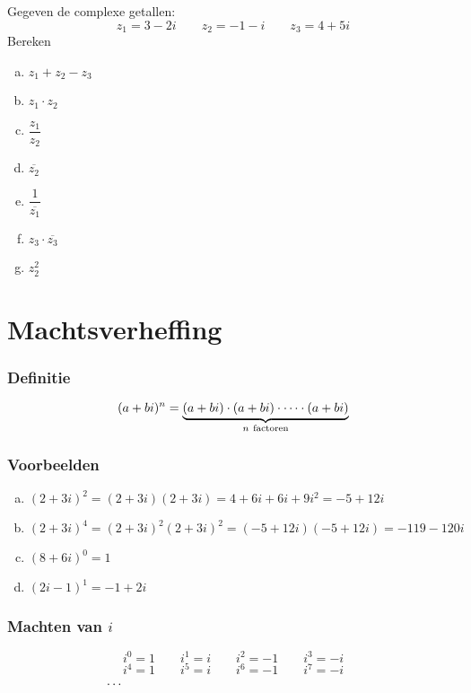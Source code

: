 \documentclass[12pt,twoside,a4]{article}
\begin{document}
\begin{oefening}
  Gegeven de complexe getallen:
  $$z_1=3-2i \qquad z_2=-1-i \qquad z_3=4+5i$$
  Bereken
  \begin{multicols}{2}
    \begin{enumerate}[(a)]
      \itemsep 1em
    \item $\displaystyle z_1+z_2-z_3$
    \item $\displaystyle z_1\cdot z_2$
    \item $\displaystyle \dfrac{z_1}{z_2}$
    \item $\displaystyle \overline{z_2}$
    \item $\displaystyle \dfrac{1}{\overline{z_1}}$
    \item $\displaystyle z_3\cdot \overline{z_3}$
    \item $\displaystyle z_2^2$
    \end{enumerate}
  \end{multicols}
\end{oefening}

\pagebreak

\section{Machtsverheffing}

\subsubsection*{Definitie}
\begin{mdframed}
$$(a+bi)^n = \underbrace{(a+bi)\cdot(a+bi)\cdot\cdots\cdot(a+bi)}_{n\mbox{ \scriptsize factoren}}$$
\end{mdframed}

\subsubsection*{Voorbeelden}
\begin{enumerate}[(a)]
  \item $(2+3i)^2=(2+3i)(2+3i)=4+6i+6i+9i^2=-5+12i$
  \item $(2+3i)^4=(2+3i)^2(2+3i)^2=(-5+12i)(-5+12i)=-119-120i$
  \item $(8+6i)^0=1$
  \item $(2i-1)^1=-1+2i$
\end{enumerate}

\subsubsection*{Machten van $i$}
$$i^0=1 \qquad i^1=i \qquad i^2=-1 \qquad i^3=-i$$
$$i^4=1 \qquad i^5=i \qquad i^6=-1 \qquad i^7=-i$$
$$\cdots\hspace*{6.7cm}$$
\end{document}
